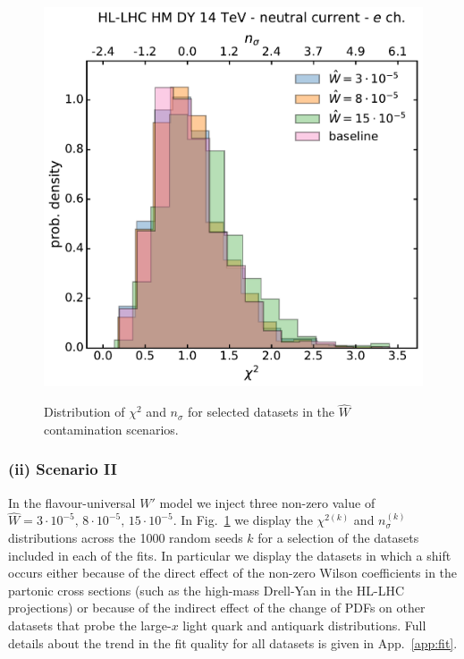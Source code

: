\documentclass[withindex,glossary]{cam-thesis}
\begin{document}
\begin{figure}[H]
  \includegraphics[width=0.48\linewidth, page=10]{Figures/chi2_nsigma_W.pdf}\\
  \caption{Distribution of $\chi^2$ and $n_\sigma$ for selected datasets in the $\hat{W}$ contamination scenarios.}
\label{fig:W_chi2_nsigma_dist}
\end{figure}

\subsubsection*{(ii) Scenario II}
\noindent  In the flavour-universal $W'$ model we inject three non-zero
value of $\hat{W}=3\cdot 10^{-5},\, 8\cdot 10^{-5},\, 15\cdot
10^{-5}$. In Fig.~\ref{fig:W_chi2_nsigma_dist} we display 
the $\chi^{2(k)}$ and $n_{\sigma}^{(k)}$ distributions
across the 1000 random seeds $k$ for a selection of the datasets
included in each of the fits. In particular we display the datasets in
which a shift occurs either because of the direct effect of the
non-zero Wilson coefficients in the partonic cross sections (such as
the high-mass Drell-Yan in the HL-LHC projections) or
because of the indirect effect of the change of PDFs on other datasets
that probe the large-$x$ light quark and antiquark distributions. Full
details about the trend in the fit quality for all datasets is
given in App.~\ref{app:fit}.
%
\end{document}
